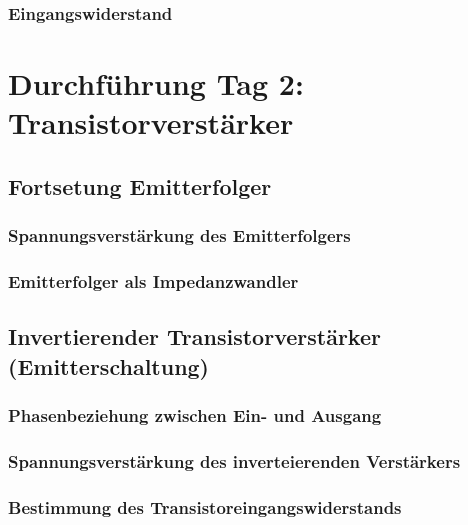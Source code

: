 \fehlt

\subsubsection{Eingangswiderstand}

\fehlt


\FloatBarrier
\section{Durchführung Tag 2: Transistorverstärker}

\subsection{Fortsetung Emitterfolger}

\subsubsection{Spannungsverstärkung des Emitterfolgers}

\subsubsection{Emitterfolger als Impedanzwandler}

\subsection{Invertierender Transistorverstärker (Emitterschaltung)}

\subsubsection{Phasenbeziehung zwischen Ein- und Ausgang}

\subsubsection{Spannungsverstärkung des inverteierenden Verstärkers}

\subsubsection{Bestimmung des Transistoreingangswiderstands}

